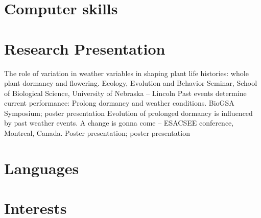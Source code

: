 \documentclass[11pt,a4paper,sans]{moderncv} %
\begin{document}
\section{Computer skills}



\section{Research Presentation}
{The role of variation in weather variables in shaping plant life histories: whole plant dormancy and flowering. Ecology, Evolution and Behavior Seminar, School of Biological Science, University of Nebraska – Lincoln}
{Past events determine current performance: Prolong dormancy and weather conditions. BioGSA Symposium; poster presentation}
{Evolution of prolonged dormancy is influenced by past weather events. A change is gonna come – ESACSEE conference, Montreal, Canada. Poster presentation; poster presentation}


\section{Languages}



\section{Interests}

\renewcommand{\listitemsymbol}{-~} %


\end{document}
